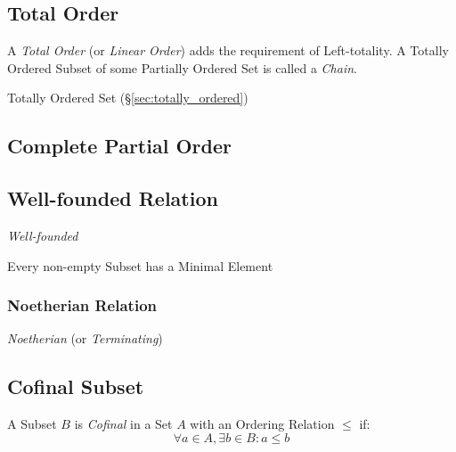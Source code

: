 \subsection{Total Order}\label{sec:total_order}

A \emph{Total Order} (or \emph{Linear Order}) adds the requirement of
Left-totality. A Totally Ordered Subset of some Partially Ordered Set
is called a \emph{Chain}.

Totally Ordered Set (\S\ref{sec:totally_ordered})



\subsection{Complete Partial Order}\label{sec:complete_partialorder}

\subsection{Well-founded Relation}\label{sec:well_founded}

\emph{Well-founded}

Every non-empty Subset has a Minimal Element



\subsubsection{Noetherian Relation}\label{sec:noetherian_relation}

\emph{Noetherian} (or \emph{Terminating})



\subsection{Cofinal Subset}\label{sec:cofinal_subset}

A Subset $B$ is \emph{Cofinal} in a Set $A$ with an Ordering Relation
$\leq$ if:
\[
  \forall a \in A, \exists b \in B : a \leq b
\]

